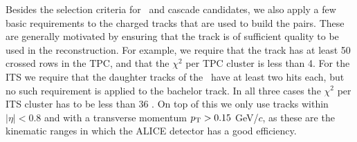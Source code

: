     Besides the selection criteria for \Lambda\ and cascade candidates, we also apply a few basic requirements to the charged tracks that are used to build the pairs. These are generally motivated by ensuring that the track is of sufficient quality to be used in the reconstruction. For example, we require that the track has at least 50 crossed rows  in the TPC, and that the $\chi^2$ per TPC cluster is less than 4. For the ITS we require that the daughter tracks of the \Lambda\ have at least two hits each, but no such requirement is applied to the bachelor track. In all three cases the $\chi^2$ per ITS cluster has to be less than 36 . On top of this we only use tracks within $|\eta| < 0.8$ and with a transverse momentum $p_{\text{T}} > 0.15$ GeV/$c$, as these are the kinematic ranges in which the ALICE detector has a good efficiency. 

